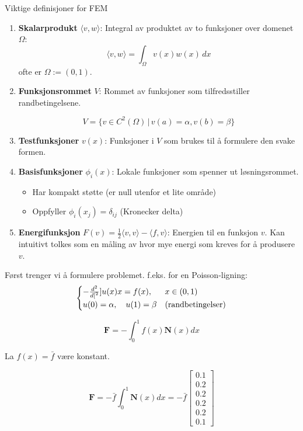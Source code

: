\begin{definition}{Viktige definisjoner for FEM}{}
    \begin{enumerate}
        \item \textbf{Skalarprodukt} \(\langle v, w \rangle\): Integral av produktet av to funksjoner over domenet \(\Omega\):
              \[ \langle v, w \rangle = \int_\Omega v(x)w(x) \, dx \]
              ofte er \(\Omega := (0,1)\).
        \item \textbf{Funksjonsrommet} \(V\): Rommet av funksjoner som tilfredsstiller randbetingelsene.

              \[ V = \{ v \in C^2(\Omega) \, | \, v(a) = \alpha, v(b) = \beta \} \]

        \item \textbf{Testfunksjoner} \(v(x)\): Funksjoner i \(V\) som brukes til å formulere den svake formen.
        \item \textbf{Basisfunksjoner} \(\phi_i(x)\): Lokale funksjoner som spenner ut løsningsrommet.
              \begin{itemize}
                  \item Har kompakt støtte (er null utenfor et lite område)
                  \item Oppfyller \(\phi_i(x_j) = \delta_{ij}\) (Kronecker delta)
              \end{itemize}
        \item \textbf{Energifunksjon} \(F(v) = \frac{1}{2} \langle v, v \rangle - \langle f, v \rangle\): Energien til en funksjon \(v\). Kan intuitivt tolkes som en måling av hvor mye energi som kreves for å produsere \(v\).
    \end{enumerate}
\end{definition}

Først trenger vi å formulere problemet. f.eks. for en Poisson-ligning:
\begin{equation}
    \begin{cases}
        -\frac{d^{2}}{d{[}^{2}}]{u(x)}{x} = f(x),  & x \in (0,1)              \\
        u(0) = \alpha, \quad u(1) = \beta & \text{(randbetingelser)}
    \end{cases}
    \label{eq:pde_poisson}
\end{equation}

\begin{equation}
    \mathbf{F} = - \int_0^1 f(x) \mathbf{N}(x) dx
\end{equation}

La \(f(x) = \bar{f}\) være konstant.

\begin{equation*}
    \mathbf{F} = - \bar{f} \int_0^1 \mathbf{N}(x) dx = - \bar{f} \begin{bmatrix}
        0.1 \\ 0.2 \\ 0.2 \\ 0.2 \\ 0.2 \\ 0.1
    \end{bmatrix}
\end{equation*}
